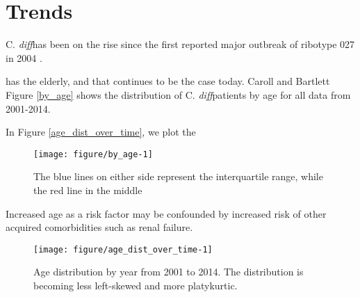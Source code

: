 \documentclass[12pt]{ociamthesis}\usepackage[]{graphicx}\usepackage[]{color}
\makeatletter
\def\maxwidth{ %
  \ifdim\Gin@nat@width>\linewidth
    \linewidth
  \else
    \Gin@nat@width
  \fi
}
\newenvironment{knitrout}{}{} %
\newcommand{\cdiff}{C. \textit{diff}}
\makeatother
\begin{document}
\section{Trends}

\cdiff has been on the rise since the first reported major outbreak of ribotype 027 in 2004 \cite{Pepin2004}. 

has  the elderly, and that continues to be the case today. Caroll and Bartlett \cite{Carroll2011}
Figure \ref{by_age} shows the distribution of \cdiff patients by age for all data from 2001-2014. 
\cite{Masgala2014}


In Figure \ref{age_dist_over_time}, we plot the



\begin{knitrout}
\color{fgcolor}\begin{figure}

{\centering \texttt{[image: figure/by\_age-1]} 

}

\caption[The blue lines on either side represent the interquartile range, while the red line in the middle ]{The blue lines on either side represent the interquartile range, while the red line in the middle }\label{fig:by_age}
\end{figure}


\end{knitrout}


Increased age as a risk factor may be confounded by increased risk of other acquired comorbidities such as renal failure. 
\cite{Krapohl2013} \cite{Masgala2014}



\begin{knitrout}
\color{fgcolor}\begin{figure}

{\centering \texttt{[image: figure/age\_dist\_over\_time-1]} 

}

\caption[Age distribution by year from 2001 to 2014]{Age distribution by year from 2001 to 2014. The distribution is becoming less left-skewed and more platykurtic.}\label{fig:age_dist_over_time}
\end{figure}


\end{knitrout}
\end{document}
